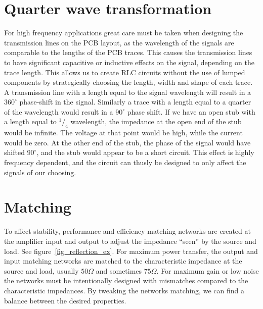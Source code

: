 \section{Quarter wave transformation}
For high frequency applications great care must be taken when designing the transmission lines on the PCB layout, as the wavelength of the signals are comparable to the lengths of the PCB traces. This causes the transmission lines to have significant capacitive or inductive effects on the signal, depending on the trace length. This allows us to create RLC circuits without the use of lumped components by strategically choosing the length, width and shape of each trace. A transmission line with a length equal to the signal wavelength will result in a $360^\circ$ phase-shift in the signal. Similarly a trace with a length equal to a quarter of the wavelength would result in a $90^\circ$ phase shift. If we have an open stub with a length equal to $^1/_4$ wavelength, the impedance at the open end of the stub would be infinite. The voltage at that point would be high, while the current would be zero. At the other end of the stub, the phase of the signal would have shifted  $90^\circ$, and the stub would appear to be a short circuit. This effect is highly frequency dependent, and the circuit can thusly be designed to only affect the signals of our choosing.
\section{Matching}
To affect stability, performance and efficiency matching networks are created at the amplifier input and output to adjust the impedance “seen” by the source and load. See figure~\ref{fig_reflection_ex}. For maximum power transfer, the output and input matching networks are matched to the characteristic impedance at the source and load, usually $50\Omega$ and sometimes $75\Omega$. For maximum gain or low noise the networks must be intentionally designed with mismatches compared to the characteristic impedances. By tweaking the networks matching, we can find a balance between the desired properties.

